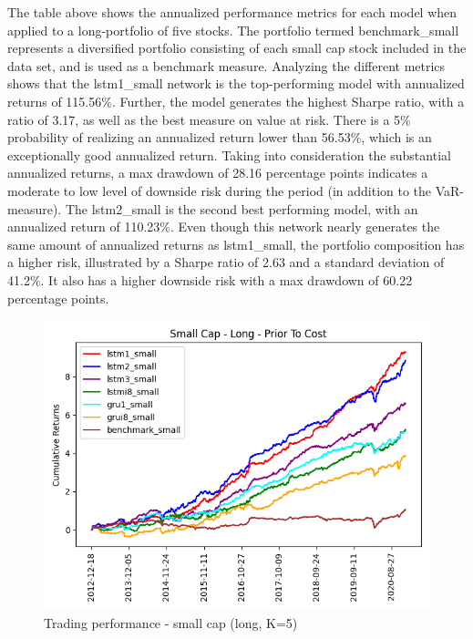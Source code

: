 \indent\newline
The table above shows the annualized performance metrics for each model when applied to a long-portfolio of five stocks. The portfolio termed benchmark\_small represents a diversified portfolio consisting of each small cap stock included in the data set, and is used as a benchmark measure. Analyzing the different metrics shows that the lstm1\_small network is the top-performing model with annualized returns of 115.56\%. Further, the model generates the highest Sharpe ratio, with a ratio of 3.17, as well as the best measure on value at risk. There is a 5\% probability of realizing an annualized return lower than 56.53\%, which is an exceptionally good annualized return. Taking into consideration the substantial annualized returns, a max drawdown of 28.16 percentage points indicates a moderate to low level of downside risk during the period (in addition to the VaR-measure). The lstm2\_small is the second best performing model, with an annualized return of 110.23\%. Even though this network nearly generates the same amount of annualized returns as lstm1\_small, the portfolio composition has a higher risk, illustrated by a Sharpe ratio of 2.63 and a standard deviation of 41.2\%. It also has a higher downside risk with a max drawdown of 60.22 percentage points.  

\indent\newline 
\begin{figure}[H]
\centering
\includegraphics [scale=0.60,angle=360]{figures/cumulative_small_cap_return_no_cost.png}
\caption{Trading performance - small cap (long, K=5)}
\label{fig:smalltrading}
\end{figure}

